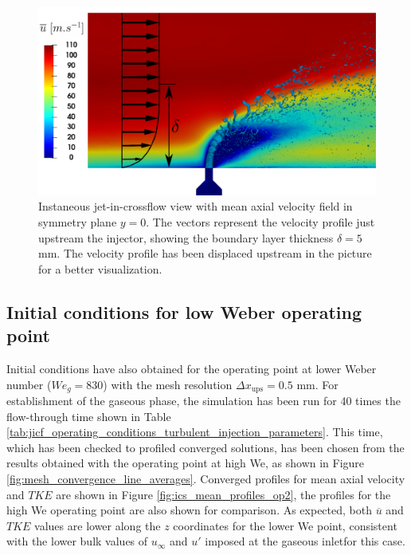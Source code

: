 \begin{figure}[ht]
\centering
\includegraphics[scale=0.2]{./part2_developments/figures_ch5_resolved_JICF/Umean_profile_with_jet_in_BL}
\caption[Instaneous jet-in-crossflow view with mean axial velocity field in symmetry plane $y = 0$]{Instaneous jet-in-crossflow view with mean axial velocity field in symmetry plane $y = 0$. The vectors represent the velocity profile just upstream the injector, showing the boundary layer thickness $\delta = 5$ mm. The velocity profile has been displaced upstream in the picture for a better visualization.}
\label{fig:Umean_profile_with_jet}
\end{figure}




\subsection{Initial conditions for low Weber operating point}

Initial conditions have also obtained for the operating point at lower Weber number ($We_g = 830$) with the mesh resolution $\Delta x_\mathrm{ups} = 0.5$ mm. For establishment of the gaseous phase, the simulation has been run for 40 times the flow-through time shown in Table \ref{tab:jicf_operating_conditions_turbulent_injection_parameters}. This time, which has been checked to profiled converged solutions, has been chosen from the results obtained with the operating point at high We, as shown in Figure \ref{fig:mesh_convergence_line_averages}. Converged profiles for mean axial velocity and $TKE$ are shown in Figure \ref{fig:ics_mean_profiles_op2}, the profiles for the high We operating point are also shown for comparison. As expected, both $\overline{u}$ and $TKE$ values are lower along the $z$ coordinates for the lower We point, consistent with the lower bulk values of $u_\infty$ and $u'$ imposed at the gaseous inletfor this case.

